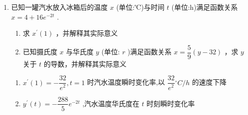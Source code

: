 \begin{enumerate}
\begin{jieda}
        ${y}^{\prime }\left( {18}\right)  = \dfrac{\pi }{8}{m}/{h}$
    \end{jieda}
    
    \item 已知一罐汽水放入冰箱后的温度 $x$ (单位:℃)与时间 $t$ (单位:h)满足函数关系 $x = 4 + {16}{e}^{-{2t}}$ .
    \begin{enumerate}
        \item 求 ${x}^{\prime }\left( 1\right)$ ，并解释其实际意义
        \item 已知摄氏度 $x$ 与华氏度 $y$ (单位: $r$ )满足函数关系 $x = \dfrac{5}{9}\left( {y - {32}}\right)$ ，求 $y$ 关于 $t$ 的导数，并解释其实际意义
    \end{enumerate}
    \begin{jieda}
        \begin{enumerate}
            \item ${x}^{\prime }\left( 1\right)  =  - \dfrac{32}{{e}^{2}},t = 1$ 时汽水温度瞬时变化率,以 $\dfrac{32}{{e}^{2}}{}^{ \circ  }{C}/{h}$ 的速度下降
            
            \item ${y}^{\prime }\left( t\right)  =  - \dfrac{288}{5}{e}^{-{2t}}$ ,汽水温度华氏度在 $t$ 时刻瞬时变化率
        \end{enumerate}
    \end{jieda}
\end{enumerate}

\clearpage

\clearpage

